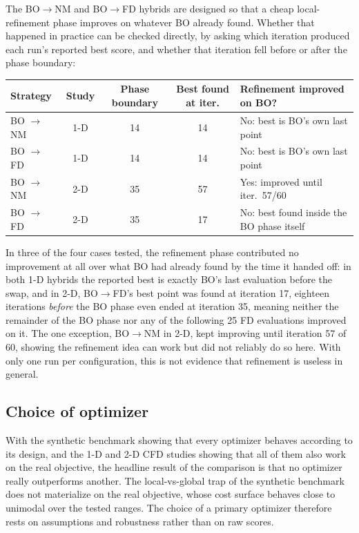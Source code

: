 The BO$\to$NM and BO$\to$FD hybrids are designed so that a cheap
local-refinement phase improves on whatever BO already found.  Whether that
happened in practice can be checked directly, by asking which iteration
produced each run's reported best score, and whether that iteration fell
before or after the phase boundary:

\begin{center}
\begin{tabular}{@{}lcccl@{}}
\toprule
Strategy & Study & Phase boundary & Best found at iter. & Refinement improved on BO? \\
\midrule
BO $\to$ NM & 1-D & 14 & 14 & No: best is BO's own last point \\
BO $\to$ FD & 1-D & 14 & 14 & No: best is BO's own last point \\
BO $\to$ NM & 2-D & 35 & 57 & Yes: improved until iter.\ 57/60 \\
BO $\to$ FD & 2-D & 35 & 17 & No: best found inside the BO phase itself \\
\bottomrule
\end{tabular}
\end{center}

In three of the four cases tested, the refinement phase contributed no
improvement at all over what BO had already found by the time it handed
off: in both 1-D hybrids the reported best is exactly BO's last evaluation
before the swap, and in 2-D, BO$\to$FD's best point was found at iteration
17, eighteen iterations \emph{before} the BO phase even ended at iteration
35, meaning neither the remainder of the BO phase nor any of the following
25 FD evaluations improved on it.  The one exception, BO$\to$NM in 2-D,
kept improving until iteration 57 of 60, showing the refinement idea can
work but did not reliably do so here.  With only one run per configuration,
this is not evidence that refinement is useless in general.

\subsection{Choice of optimizer}
\label{sec:cfd-choice}

With the synthetic benchmark showing that every optimizer behaves according
to its design, and the 1-D and 2-D CFD studies showing that all of them
also work on the real objective, the headline result of the comparison is
that no optimizer really outperforms another. The local-vs-global trap of the synthetic benchmark does not
materialize on the real objective, whose cost surface behaves close to
unimodal over the tested ranges.  The choice of a primary optimizer
therefore rests on assumptions and robustness rather than on raw scores.

